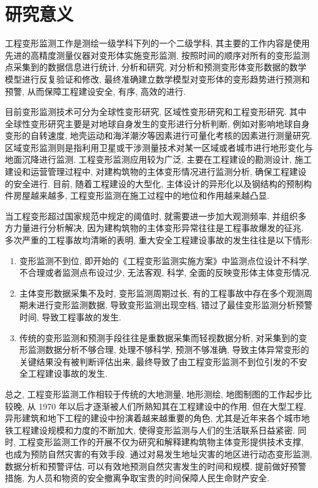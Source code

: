 \section{研究意义}
工程变形监测工作是测绘一级学科下列的一个二级学科, 其主要的工作内容是使用先进的高精度测量仪器对变形体实施变形监测, 按照时间的顺序对所有的变形监测点采集到的数据信息进行统计, 分析和研究, 对分析和预测变形体变形数据的数学模型进行反复验证和修改, 最终准确建立数学模型对变形体的变形趋势进行预测和预警, 从而保障工程建设安全, 有序, 高效的进行. 

目前变形监测技术可分为全球性变形研究, 区域性变形研究和工程变形研究. 其中全球性变形研究主要是对地球自身发生的变形进行分析判断, 例如对影响地球自身变形的自转速度, 地壳运动和海洋潮汐等因素进行可量化考核的因素进行测量研究. 区域变形监测则是指利用卫星或干涉测量技术对某一区域或者城市进行地形变化与地面沉降进行监测. 工程变形监测应用较为广泛, 主要在工程建设的勘测设计, 施工建设和运营管理过程中, 对建构筑物的主体变形情况进行监测分析, 确保工程建设的安全进行. 目前, 随着工程建设的大型化, 主体设计的异形化以及钢结构的预制构件房屋越来越多, 工程变形监测在施工过程中的地位和作用越来越凸显. 

当工程变形超过国家规范中规定的阈值时, 就需要进一步加大观测频率, 并组织多方力量进行分析解决, 因为建构筑物的主体变形异常往往是工程事故爆发的征兆. 多次严重的工程事故均清晰的表明, 重大安全工程建设事故的发生往往是以下情形: 
\begin{enumerate}
    \item 变形监测不到位, 即开始的《工程变形监测实施方案》中监测点位设计不科学, 不合理或者监测点布设过少, 无法客观, 科学, 全面的反映变形体主体变形情况. 
    \item 主体变形数据采集不及时, 变形监测周期过长, 有的工程事故中存在多个观测周期未进行变形监测数据, 导致变形监测出现空档, 错过了最佳变形监测分析预警时间, 导致工程事故的发生.
    \item 传统的变形监测和预测手段往往是重数据采集而轻视数据分析, 对采集到的变形监测数据分析不够合理, 处理不够科学, 预测不够准确, 导致主体异常变形的关键结果没有被判断评估出来, 最终导致了由工程变形监测不到位引发的不安全工程建设事故的发生. 
\end{enumerate}

总之, 工程变形监测工作相较于传统的大地测量, 地形测绘, 地图制图的工作起步比较晚, 从 1970 年以后才逐渐被人们所熟知其在工程建设中的作用. 但在大型工程, 异形建筑和地下工程的建设中扮演着越来越重要的角色, 尤其是近年来各个城市地铁工程建设规模和力度的不断加大, 使得变形监测与人们的生活联系日益紧密. 同时, 工程变形监测工作的开展不仅为研究和解释建构筑物主体变形提供技术支撑, 也成为预防自然灾害的有效手段. 通过对易发生地址灾害的地区进行动态变形监测, 数据分析和预警评估, 可以有效地预测自然灾害发生的时间和规模, 提前做好预警措施, 为人员和物资的安全撤离争取宝贵的时间保障人民生命财产安全.

